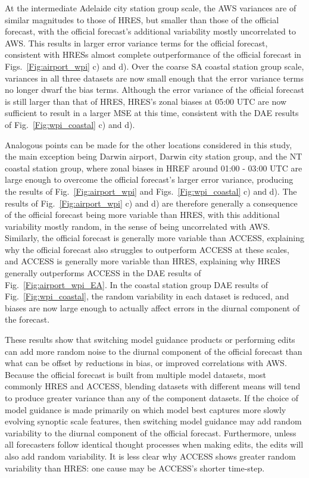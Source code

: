 \documentclass{ametsoc}
\begin{document}
At the intermediate Adelaide city station group scale, the AWS variances are of similar magnitudes to those of HRES, but smaller than those of the official forecast, with the official forecast's additional variability mostly uncorrelated to AWS. This results in larger error variance terms for the official forecast, consistent with HRESs almost complete outperformance of the official forecast in Figs.~\ref{Fig:airport_wpi} c) and d). Over the coarse SA coastal station group scale, variances in all three datasets are now small enough that the error variance terms no longer dwarf the bias terms. Although the error variance of the official forecast is still larger than that of HRES, HRES's zonal biases at 05:00 UTC are now sufficient to result in a larger MSE at this time, consistent with the DAE results of Fig.~\ref{Fig:wpi_coastal} c) and d). 

Analogous points can be made for the other locations considered in this study, the main exception being Darwin airport, Darwin city station group, and the NT coastal station group, where zonal biases in HREF around 01:00 - 03:00 UTC are large enough to overcome the official forecast's larger error variance, producing the results of Fig.~\ref{Fig:airport_wpi} and Figs.~\ref{Fig:wpi_coastal} c) and d). The results of Fig.~\ref{Fig:airport_wpi} c) and d) are therefore generally a consequence of the official forecast being more variable than HRES, with this additional variability mostly random, in the sense of being uncorrelated with AWS. Similarly, the official forecast is generally more variable than ACCESS, explaining why the official forecast also struggles to outperform ACCESS at these scales, and ACCESS is generally more variable than HRES, explaining why HRES generally outperforms ACCESS in the DAE results of Fig.~\ref{Fig:airport_wpi_EA}. In the coastal station group DAE results of Fig.~\ref{Fig:wpi_coastal}, the random variability in each dataset is reduced, and biases are now large enough to actually affect errors in the diurnal component of the forecast.  

These results show that switching model guidance products or performing edits can add more random noise to the diurnal component of the official forecast than what can be offset by reductions in bias, or improved correlations with AWS. Because the official forecast is built from multiple model datasets, most commonly HRES and ACCESS, blending datasets with different means will tend to produce greater variance than any of the component datasets. If the choice of model guidance is made primarily on which model best captures more slowly evolving synoptic scale features, then switching model guidance may add random variability to the diurnal component of the official forecast. Furthermore, unless all forecasters follow identical thought processes when making edits, the edits will also add random variability. It is less clear why ACCESS shows greater random variability than HRES: one cause may be ACCESS's shorter time-step.  
\end{document}
